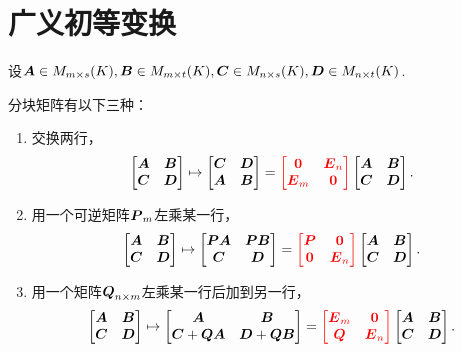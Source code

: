 \section{广义初等变换}
设\(\boldsymbol{A} \in M_{m \times s}(K),
\boldsymbol{B} \in M_{m \times t}(K),
\boldsymbol{C} \in M_{n \times s}(K),
\boldsymbol{D} \in M_{n \times t}(K)\).

\def\OriginalMatrix{
	\begin{bmatrix}
		\vb{A} & \vb{B} \\
		\vb{C} & \vb{D}
	\end{bmatrix}
}
分块矩阵有以下三种：
\begin{enumerate}
	\item 交换两行，\[
		\OriginalMatrix
		\mapsto \begin{bmatrix}
			\vb{C} & \vb{D} \\
			\vb{A} & \vb{B}
		\end{bmatrix}
		= {\color{red} \begin{bmatrix}
			\vb0 & \vb{E}_n \\
			\vb{E}_m & \vb0
		\end{bmatrix}}
		\OriginalMatrix.
	\]

	\item 用一个可逆矩阵\(\boldsymbol{P}_m\)左乘某一行，\[
		\OriginalMatrix
		\mapsto \begin{bmatrix}
			\vb{P}\vb{A} & \vb{P}\vb{B} \\
			\vb{C} & \vb{D}
		\end{bmatrix}
		= {\color{red} \begin{bmatrix}
			\vb{P} & \vb0 \\
			\vb0 & \vb{E}_n
		\end{bmatrix}}
		\OriginalMatrix.
	\]

	\item 用一个矩阵\(\boldsymbol{Q}_{n \times m}\)左乘某一行后加到另一行，\[
		\OriginalMatrix
		\mapsto \begin{bmatrix}
		\vb{A} & \vb{B} \\
		\vb{C}+\vb{Q}\vb{A} & \vb{D}+\vb{Q}\vb{B}
		\end{bmatrix}
		= {\color{red} \begin{bmatrix}
		\vb{E}_m & \vb0 \\
		\vb{Q} & \vb{E}_n
		\end{bmatrix}}
		\OriginalMatrix.
	\]
\end{enumerate}

